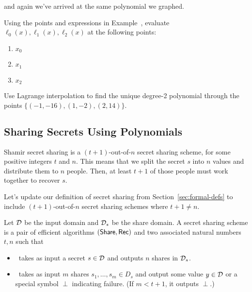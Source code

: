 \begin{example}
and again we've arrived at the same polynomial we graphed.
\end{example}

\begin{exercise}
    Using the points and expressions in Example~,
    evaluate $\ell_0(x), \ell_1(x), \ell_2(x)$ at the following points:
    \renewcommand{\labelenumi}{(\alph{enumi})} 
    \begin{enumerate}
        \item $x_0$
        \item $x_1$
        \item $x_2$
    \end{enumerate}
\end{exercise}

\begin{bonus}
    Use Lagrange interpolation to find the unique degree-2 
    polynomial through the points $\{(-1,-16),(1,-2),(2,14)\}$.
\end{bonus}

\subsection{Sharing Secrets Using Polynomials}

Shamir secret sharing is a $(t+1)$-out-of-$n$ secret sharing scheme, for some positive integers $t$ and $n$. This means that we split the secret $s$ into $n$ values and distribute them to $n$ people. Then, at least $t+1$ of those people must work together to recover $s$.

Let's update our definition of secret sharing from Section~\ref{sec:formal-defs}
to include $(t+1)$-out-of-$n$ secret sharing schemes where $t+1 \neq n$.

\begin{definition}\label{def:ss-update}
    Let $\mathcal{D}$ be the input domain and $\mathcal{D}_s$ be the share domain.
    A secret sharing scheme is a pair of efficient algorithms $(\mathsf{Share}, \mathsf{Rec})$
    and two associated natural numbers $t,n$ such that

    \begin{itemize}
        \item \share~takes as input a secret $s \in \mathcal{D}$ and outputs $n$ 
        shares in $\mathcal{D}_s$.
        \item \rec~takes as input $m$ shares $s_1, \ldots, s_m \in D_s$ 
        and output some value $y \in \mathcal{D}$ or a special symbol $\perp$ 
        indicating failure. (If $m < t+1$, it outputs $\perp$.)
    \end{itemize}
\end{definition}

